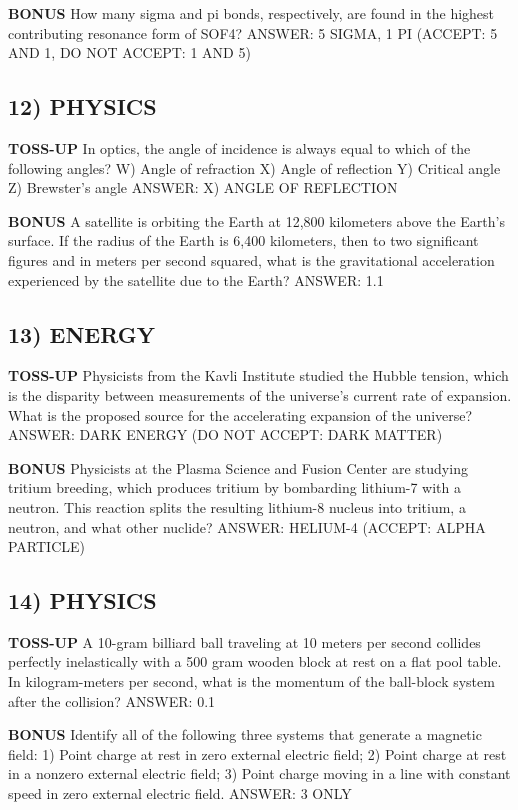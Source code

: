 \documentclass{article}
\begin{document}
\textbf{BONUS}
How many sigma and pi bonds, respectively, are found in the highest contributing resonance form of SOF4?
ANSWER: 5 SIGMA, 1 PI (ACCEPT: 5 AND 1, DO NOT ACCEPT: 1 AND 5)

\subsection*{12) PHYSICS}
\textbf{TOSS-UP}
In optics, the angle of incidence is always equal to which of the following angles?
W) Angle of refraction
X) Angle of reflection
Y) Critical angle
Z) Brewster's angle
ANSWER: X) ANGLE OF REFLECTION

\textbf{BONUS}
A satellite is orbiting the Earth at 12,800 kilometers above the Earth's surface. If the radius of the Earth is 6,400 kilometers, then to two significant figures and in meters per second squared, what is the gravitational acceleration experienced by the satellite due to the Earth?
ANSWER: 1.1

\subsection*{13) ENERGY}
\textbf{TOSS-UP}
Physicists from the Kavli Institute studied the Hubble tension, which is the disparity between measurements of the universe's current rate of expansion. What is the proposed source for the accelerating expansion of the universe?
ANSWER: DARK ENERGY (DO NOT ACCEPT: DARK MATTER)

\textbf{BONUS}
Physicists at the Plasma Science and Fusion Center are studying tritium breeding, which produces tritium by bombarding lithium-7 with a neutron. This reaction splits the resulting lithium-8 nucleus into tritium, a neutron, and what other nuclide?
ANSWER: HELIUM-4 (ACCEPT: ALPHA PARTICLE)

\subsection*{14) PHYSICS}
\textbf{TOSS-UP}
A 10-gram billiard ball traveling at 10 meters per second collides perfectly inelastically with a 500 gram wooden block at rest on a flat pool table. In kilogram-meters per second, what is the momentum of the ball-block system after the collision?
ANSWER: 0.1

\textbf{BONUS}
Identify all of the following three systems that generate a magnetic field: 1) Point charge at rest in zero external electric field; 2) Point charge at rest in a nonzero external electric field; 3) Point charge moving in a line with constant speed in zero external electric field.
ANSWER: 3 ONLY
\end{document}
